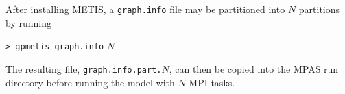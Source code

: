 After installing METIS, a {\tt graph.info} file may be partitioned into $N$ partitions by running

\vspace{12pt}
{\tt > gpmetis graph.info} $N$
\vspace{12pt}

\noindent The resulting file, {\tt graph.info.part.}$N$, can then be copied into the MPAS run directory
before running the model with $N$ MPI tasks.

